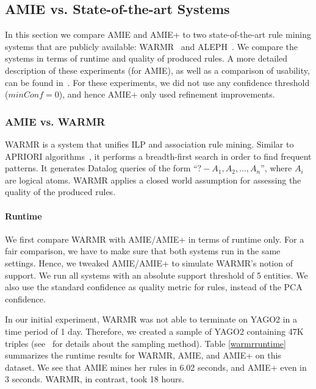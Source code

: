 




\subsection{AMIE vs. State-of-the-art Systems} \label{competitors}
In this section we compare AMIE and AMIE+ to two state-of-the-art rule mining systems 
that are publicly available:
WARMR~\cite{GoeVan02} and ALEPH~\cite{Muggleton:1996:LPD:647996.742465}. We compare the systems in terms of runtime and quality of produced rules. A more detailed description of these experiments (for AMIE), as well as a comparison of usability, can be found in~\cite{amie}.
For these experiments, we did not use any confidence threshold ($minConf=0$), and hence AMIE+ only used refinement improvements.

\subsubsection{AMIE vs. WARMR}
WARMR is a system that unifies ILP and association rule mining. Similar to APRIORI algorithms~\cite{Agrawal:1996:FDA:257938.257975}, it performs a
breadth-first search in order to find frequent patterns.
It generates Datalog queries of the form ``$?-A_1,A_2,...,A_n$'',
where $A_i$ are logical atoms. WARMR applies a closed world assumption for assessing the quality of the produced rules.

\paragraph{Runtime}
We first compare WARMR with AMIE/AMIE+ in terms of runtime only. 
For a fair comparison, we have to make sure that both systems run in the same settings. Hence, we tweaked AMIE/AMIE+ to simulate WARMR's notion of support. 
We run all systems with an absolute support threshold of 5 entities. 
We also use the standard confidence as quality metric for rules, instead of the PCA confidence.  

In our initial experiment, WARMR was not able to terminate on YAGO2 in a time period of 1 day. 
Therefore, we created a sample of YAGO2 containing 47K triples (see~\cite{amie} for details about the sampling method). 
Table \ref{warmrruntime} summarizes the runtime results for WARMR, AMIE, and AMIE+ on this dataset. 
We see that AMIE mines her rules in 6.02 seconds, and AMIE+ even in 3 seconds. WARMR, in contrast, took 18 hours. 

